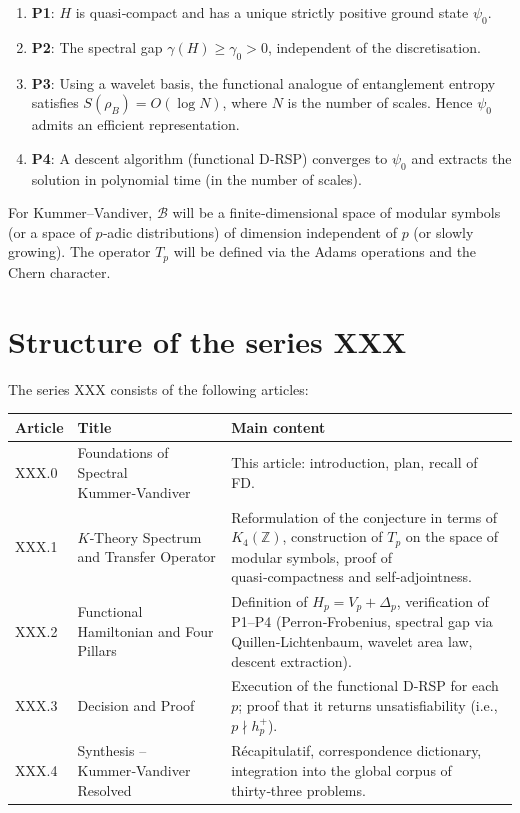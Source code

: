 \documentclass[11pt,a4paper]{article}
\begin{document}
\begin{enumerate}
\item \textbf{P1}: $H$ is quasi‑compact and has a unique strictly positive ground state $\psi_0$.
\item \textbf{P2}: The spectral gap $\gamma(H) \ge \gamma_0 > 0$, independent of the discretisation.
\item \textbf{P3}: Using a wavelet basis, the functional analogue of entanglement entropy satisfies $S(\rho_B) = O(\log N)$, where $N$ is the number of scales. Hence $\psi_0$ admits an efficient representation.
\item \textbf{P4}: A descent algorithm (functional D‑RSP) converges to $\psi_0$ and extracts the solution in polynomial time (in the number of scales).
\end{enumerate}

For Kummer–Vandiver, $\mathcal{B}$ will be a finite‑dimensional space of modular symbols (or a space of $p$‑adic distributions) of dimension independent of $p$ (or slowly growing). The operator $T_p$ will be defined via the Adams operations and the Chern character.

\section{Structure of the series XXX}

The series XXX consists of the following articles:

\begin{center}
\begin{tabular}{@{}llp{8cm}@{}}
\toprule
\textbf{Article} & \textbf{Title} & \textbf{Main content} \\
\midrule
XXX.0 & Foundations of Spectral Kummer‑Vandiver & This article: introduction, plan, recall of FD. \\
XXX.1 & $K$‑Theory Spectrum and Transfer Operator & Reformulation of the conjecture in terms of $K_4(\mathbb{Z})$, construction of $T_p$ on the space of modular symbols, proof of quasi‑compactness and self‑adjointness. \\
XXX.2 & Functional Hamiltonian and Four Pillars & Definition of $H_p = V_p + \Delta_p$, verification of P1–P4 (Perron‑Frobenius, spectral gap via Quillen‑Lichtenbaum, wavelet area law, descent extraction). \\
XXX.3 & Decision and Proof & Execution of the functional D‑RSP for each $p$; proof that it returns unsatisfiability (i.e., $p \nmid h_p^+$). \\
XXX.4 & Synthesis – Kummer‑Vandiver Resolved & Récapitulatif, correspondence dictionary, integration into the global corpus of thirty‑three problems. \\
\bottomrule
\end{tabular}
\end{center}
\end{document}

